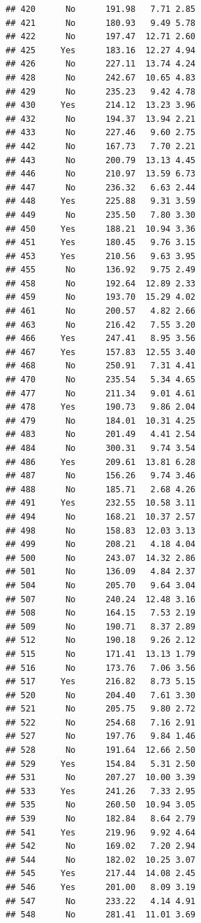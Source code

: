 \documentclass[
]{article}
\begin{document}
\begin{verbatim}
## 420      No      191.98   7.71 2.85
## 421      No      180.93   9.49 5.78
## 422      No      197.47  12.71 2.60
## 425     Yes      183.16  12.27 4.94
## 426      No      227.11  13.74 4.24
## 428      No      242.67  10.65 4.83
## 429      No      235.23   9.42 4.78
## 430     Yes      214.12  13.23 3.96
## 432      No      194.37  13.94 2.21
## 433      No      227.46   9.60 2.75
## 442      No      167.73   7.70 2.21
## 443      No      200.79  13.13 4.45
## 446      No      210.97  13.59 6.73
## 447      No      236.32   6.63 2.44
## 448     Yes      225.88   9.31 3.59
## 449      No      235.50   7.80 3.30
## 450     Yes      188.21  10.94 3.36
## 451     Yes      180.45   9.76 3.15
## 453     Yes      210.56   9.63 3.95
## 455      No      136.92   9.75 2.49
## 458      No      192.64  12.89 2.33
## 459      No      193.70  15.29 4.02
## 461      No      200.57   4.82 2.66
## 463      No      216.42   7.55 3.20
## 466     Yes      247.41   8.95 3.56
## 467     Yes      157.83  12.55 3.40
## 468      No      250.91   7.31 4.41
## 470      No      235.54   5.34 4.65
## 477      No      211.34   9.01 4.61
## 478     Yes      190.73   9.86 2.04
## 479      No      184.01  10.31 4.25
## 483      No      201.49   4.41 2.54
## 484      No      300.31   9.74 3.54
## 486     Yes      209.61  13.81 6.28
## 487      No      156.26   9.74 3.46
## 488      No      185.71   2.68 4.26
## 491     Yes      232.55  10.58 3.11
## 494      No      168.21  10.37 2.57
## 498      No      158.83  12.03 3.13
## 499      No      208.21   4.18 4.04
## 500      No      243.07  14.32 2.86
## 501      No      136.09   4.84 2.37
## 504      No      205.70   9.64 3.04
## 507      No      240.24  12.48 3.16
## 508      No      164.15   7.53 2.19
## 509      No      190.71   8.37 2.89
## 512      No      190.18   9.26 2.12
## 515      No      171.41  13.13 1.79
## 516      No      173.76   7.06 3.56
## 517     Yes      216.82   8.73 5.15
## 520      No      204.40   7.61 3.30
## 521      No      205.75   9.80 2.72
## 522      No      254.68   7.16 2.91
## 527      No      197.76   9.84 1.46
## 528      No      191.64  12.66 2.50
## 529     Yes      154.84   5.31 2.50
## 531      No      207.27  10.00 3.39
## 533     Yes      241.26   7.33 2.95
## 535      No      260.50  10.94 3.05
## 539      No      182.84   8.64 2.79
## 541     Yes      219.96   9.92 4.64
## 542      No      169.02   7.20 2.94
## 544      No      182.02  10.25 3.07
## 545     Yes      217.44  14.08 2.45
## 546     Yes      201.00   8.09 3.19
## 547      No      233.22   4.14 4.91
## 548      No      281.41  11.01 3.69

\end{verbatim}
\end{document}
